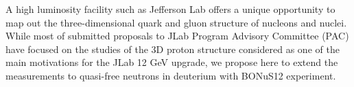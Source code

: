 A high luminosity facility such as Jefferson Lab offers a unique opportunity to 
map out the three-dimensional quark and gluon structure of nucleons and nuclei.  
While most of submitted proposals to JLab Program Advisory Committee (PAC) have 
focused on the studies of the 3D proton structure considered as one of the main 
motivations for the JLab 12 GeV upgrade, we propose here to extend the 
measurements to quasi-free neutrons in deuterium with BONuS12 experiment.  


